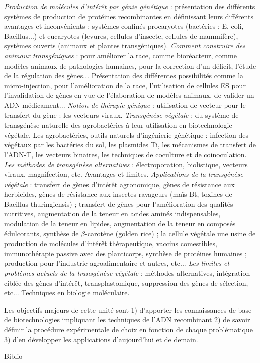 \documentclass[10pt, a5paper]{report}
\begin{document}
{
\textit{Production de molécules d’intérêt par génie génétique} : présentation des différents systèmes de production de protéines recombinantes en définissant leurs différents avantages et inconvénients : systèmes confinés procaryotes (bactéries : E. coli, Bacillus...) et eucaryotes (levures, cellules d’insecte, cellules de mammifère), systèmes ouverts (animaux et plantes transgéniques).
\textit{Comment construire des animaux transgéniques} : pour améliorer la race, comme bioréacteur, comme modèles animaux de pathologies humaines, pour la correction d’un déficit, l’étude de la régulation des gènes... Présentation des différentes possibilités comme la micro-injection, pour l’amélioration de la race, l’utilisation de cellules ES pour l’invalidation de gènes en vue de l’élaboration de modèles animaux, de valider un ADN médicament... 
\textit{Notion de thérapie génique} : utilisation de vecteur pour le transfert du gène : les vecteurs viraux.
\textit{Transgénèse végétale} : du système de transgénèse naturelle des agrobactéries à leur utilisation en biotechnologie végétale. Les agrobactéries, outils naturels d’ingénierie génétique : infection des végétaux par les bactéries du sol, les plasmides Ti, les mécanismes de transfert de l’ADN-T, les vecteurs binaires, les techniques de coculture et de coinoculation. 
\textit{Les méthodes de transgénèse alternatives} : électroporation, biolistique, vecteurs viraux, magnifection, etc. Avantages et limites. 
\textit{Applications de la transgénèse végétale} : transfert de gènes d’intérêt agronomique, gènes de résistance aux herbicides, gènes de résistance aux insectes ravageurs (maïs Bt, toxines de Bacillus thuringiensis) ; transfert de gènes pour l’amélioration des qualités nutritives, augmentation de la teneur en acides aminés indispensables, modulation de la teneur en lipides, augmentation de la teneur en composés édulcorants, synthèse de $\beta$-carotène (golden rice) ; la cellule végétale une usine de production de molécules d’intérêt thérapeutique, vaccins comestibles, immunothérapie passive avec des planticorps, synthèse de protéines humaines ; production pour l’industrie agroalimentaire et autres, etc... 
\textit{Les limites et problèmes actuels de la transgénèse végétale} : méthodes alternatives, intégration ciblée des gènes d’intérêt, transplastomique, suppression des gènes de sélection, etc...
} 
{Techniques en biologie moléculaire.
} 
{\begin{itemize} 
  \ObjItem Les objectifs majeurs de cette unité sont 1) d’apporter les connaissances de base de biotechnologies impliquant les techniques de l’ADN recombinant 2) de savoir définir la procédure expérimentale de choix en fonction de chaque problématique 3) d’en développer les applications d’aujourd’hui et de demain.
\end{itemize} 
}
{}
{Biblio}
 
\end{document}
